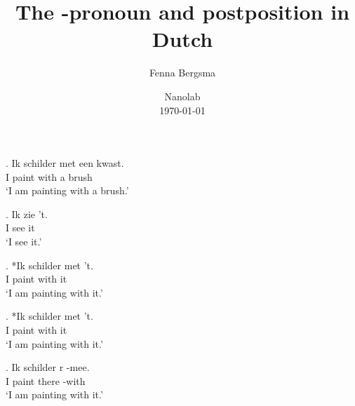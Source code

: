 \documentclass[xcolor=dvipsnames,10pt]{beamer}
\title{The \tsc{r}-pronoun and postposition \tit{waar-mee} in Dutch}
\author{Fenna Bergsma}
\date{Nanolab\\ \today}
\institute{Goethe-Universität Frankfurt}
\begin{document}
\begin{frame}
	\titlepage

\end{frame}


\begin{frame}

\exg. Ik schilder met een kwast.\\
 I paint with a brush\\
 `I am painting with a brush.'\label{ex:metdp}

 \pause

\exg. Ik zie 't.\\
 I see it\\
 `I see it.'\label{ex:tverb}

\pause

\exg. *Ik schilder met 't.\\
 I paint with it\\
 `I am painting with it.'

\end{frame}


\begin{frame}

\exg. *Ik schilder met 't.\\
 I paint with it\\
 `I am painting with it.'\label{ex:neemett}

\pause

\exg. Ik schilder r -mee.\\
 I paint there -with\\
 `I am painting with it.'\label{ex:jarmee}

\end{frame}


\begin{frame}


\end{frame}
\end{document}
